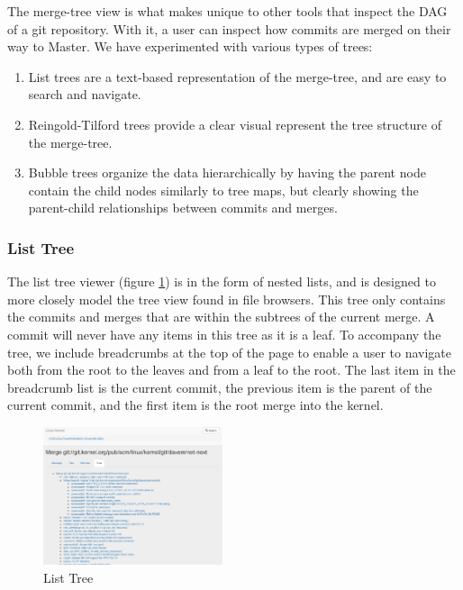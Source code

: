 \documentclass[conference, draftclsnofoot, draft]{IEEEtran}
\begin{document}
The merge-tree view is what makes \tool unique to other tools that inspect the DAG of a git repository. With it, a user can inspect how commits are merged
on their way to Master. We have experimented with various types of trees:

\begin{enumerate}
        \item List trees are a text-based representation of the merge-tree, and are easy to search and navigate.
        \item Reingold-Tilford trees provide a clear visual represent the tree structure of the merge-tree.
        \item Bubble trees organize the data hierarchically by having the parent node contain the child nodes similarly to tree maps, but
                clearly showing the parent-child relationships between commits and merges.
\end{enumerate}


\subsubsection{List Tree}

The list tree viewer (figure \ref{fig:list_tree}) is in the form of nested lists,
and is designed to more closely model the tree view found in file browsers. This
tree only contains the commits and merges that are within the subtrees of the
current merge. A commit will never have any items in this tree as it is a leaf. To
accompany the tree, we include breadcrumbs at the top of the page to enable a user
to navigate both from the root to the leaves and from a leaf to the root. The last
item in the breadcrumb list is the current commit, the previous item is the parent
of the current commit, and the first item is the root merge into the kernel.

\begin{figure}
        \centering
        \includegraphics[width=0.47\textwidth]{figures/list_tree.png}
        \caption{List Tree}
        \label{fig:list_tree}
\end{figure}
\end{document}

